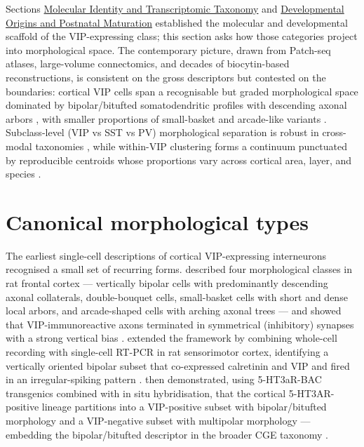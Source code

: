 \documentclass[11pt]{article}
\begin{document}
Sections \href{/classification}{Molecular Identity and Transcriptomic Taxonomy} and \href{/development}{Developmental Origins and Postnatal Maturation} established the molecular and developmental scaffold of the VIP-expressing class; this section asks how those categories project into morphological space. The contemporary picture, drawn from Patch-seq atlases, large-volume connectomics, and decades of biocytin-based reconstructions, is consistent on the gross descriptors but contested on the boundaries: cortical VIP cells span a recognisable but graded morphological space dominated by bipolar/bitufted somatodendritic profiles with descending axonal arbors \citep{Apicella2022}, with smaller proportions of small-basket and arcade-like variants \citep{Rudy2011, Yayon2023}. Subclass-level (VIP vs SST vs PV) morphological separation is robust in cross-modal taxonomies \citep{Gouwens2019, Gouwens2020a, Gliko2024, Elabbady2025}, while within-VIP clustering forms a continuum punctuated by reproducible centroids whose proportions vary across cortical area, layer, and species \citep{Gouwens2020a, Gouwens2020b, Pronneke2015, Chartrand2023}.

\section{Canonical morphological types}

The earliest single-cell descriptions of cortical VIP-expressing interneurons recognised a small set of recurring forms. \citet{Kawaguchi1996} described four morphological classes in rat frontal cortex --- vertically bipolar cells with predominantly descending axonal collaterals, double-bouquet cells, small-basket cells with short and dense local arbors, and arcade-shaped cells with arching axonal trees --- and showed that VIP-immunoreactive axons terminated in symmetrical (inhibitory) synapses with a strong vertical bias \citep{Kawaguchi1996, Cauli1997, Cauli2014, Apicella2022}. \citet{Cauli1997} extended the framework by combining whole-cell recording with single-cell RT-PCR in rat sensorimotor cortex, identifying a vertically oriented bipolar subset that co-expressed calretinin and VIP and fired in an irregular-spiking pattern \citep{Cauli1997, Cauli2014, Vucurovic2010, Stachniak2021}. \citet{Vucurovic2010} then demonstrated, using 5-HT3aR-BAC transgenics combined with in situ hybridisation, that the cortical 5-HT3AR-positive lineage partitions into a VIP-positive subset with bipolar/bitufted morphology and a VIP-negative subset with multipolar morphology --- embedding the bipolar/bitufted descriptor in the broader CGE taxonomy \citep{Vucurovic2010, Rudy2011, Cauli2014, Fishell2020}.
\end{document}
